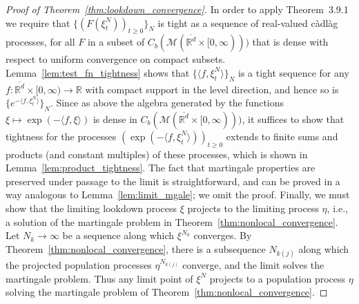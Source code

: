 \documentclass[EJP]{ejpecp} %
\newcommand{\IR}{\mathbb R}
\newcommand{\lp}{\xi}              %
\newcommand{\lpmeasures}{\mathcal{M}(\overline{\IR^d} \times [0,\infty))} %
\newcommand{\citet}[1]{\cite{#1}}
\begin{document}
\begin{proof}[Proof of Theorem~\ref{thm:lookdown_convergence}]
    In order to apply \citet{ethier/kurtz:1986} Theorem~3.9.1
    we require that $\{(F(\lp^N_t))_{t \ge 0}\}_N$
    is tight as a sequence of real-valued c\`adl\`ag processes, for all $F$ in a subset
    of $C_b(\lpmeasures)$ %
    that is dense with respect to uniform convergence on compact subsets.
    Lemma~\ref{lem:test_fn_tightness} shows that
    $\{\langle f, \lp^N_t \rangle\}_N$ is a tight sequence
    for any $f: \overline{\IR^d} \times [0,\infty) \to \IR$ with compact support
    in the level direction,
    and hence so is $\{e^{-\langle f, \lp^N_t \rangle}\}_N$.
    Since as above the algebra generated by the functions $\lp \mapsto \exp(-\langle f, \lp \rangle)$
    is dense in $C_b(\lpmeasures)$,
    it suffices to show that tightness for the processes $(\exp(-\langle f, \lp^N_t\rangle))_{t \ge 0}$
    extends to finite sums and products (and constant multiples) of these processes,
    which is shown in Lemma~\ref{lem:product_tightness}.
    The fact that martingale properties are preserved under passage to the limit
    is straightforward, and can be proved in a way analogous to Lemma~\ref{lem:limit_mgale};
    we omit the proof.
    Finally, we must show that the limiting lookdown process $\lp$
    projects to the limiting process $\eta$, i.e., a solution of the martingale
    problem in Theorem~\ref{thm:nonlocal_convergence}.
    Let $N_k \to \infty$ be a sequence along which $\lp^{N_k}$ converges.
    By Theorem~\ref{thm:nonlocal_convergence},
    there is a subsequence $N_{k(j)}$ along which the projected population processes
    $\eta^{N_{k(j)}}$ converge, and the limit solves the martingale problem.
    Thus any limit point of $\lp^N$ projects to a population process $\eta$
    solving the martingale problem of Theorem~\ref{thm:nonlocal_convergence}.
\end{proof}
\end{document}
